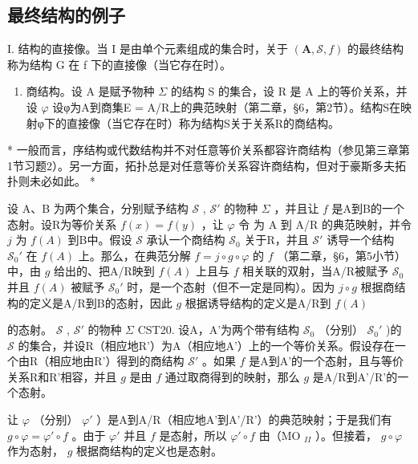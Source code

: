 \subsection{最终结构的例子}

I. 结构的直接像。当 I 是由单个元素组成的集合时，关于 \((\mathbf{A}, \mathcal{S}, f)\) 的最终结构称为结构 G 在 f 下的直接像（当它存在时）。

\begin{enumerate}
\def\labelenumi{\Roman{enumi}.}
\setcounter{enumi}{1}
\tightlist
\item
  商结构。设 A 是赋予物种 \(\Sigma\) 的结构 S 的集合，设 R 是 A 上的等价关系，并设 \(\varphi\) 设φ为A到商集E = A/R上的典范映射（第二章，§6，第2节）。结构S在映射φ下的直接像（当它存在时）称为结构S关于关系R的商结构。
\end{enumerate}

* 一般而言，序结构或代数结构并不对任意等价关系都容许商结构（参见第三章第1节习题2）。另一方面，拓扑总是对任意等价关系容许商结构，但对于豪斯多夫拓扑则未必如此。 *

设 A、B 为两个集合，分别赋予结构 \(\mathcal{S}\) , \(\mathcal{S}'\) 的物种 \(\Sigma\) ，并且让 \(f\) 是A到B的一个态射。设R为等价关系 \(f(x) = f(y)\) ，让 \(\varphi\) 令 为 A 到 A/R 的典范映射，并令 \(j\) 为 \(f(A)\) 到B中。假设 \(\mathcal{S}\) 承认一个商结构 \(\mathcal{S}_0\) 关于R，并且 \(\mathcal{S}'\) 诱导一个结构 \(\mathcal{S}_0'\) 在 \(f(A)\) 上。那么，在典范分解 \(f = j \circ g \circ \varphi\) 的 \(f\) （第二章，§6，第5小节）中，由 \(g\) 给出的、把A/R映到 \(f(A)\) 上且与 \(f\) 相关联的双射，当A/R被赋予 \(\mathcal{S}_0\) 并且 \(f(A)\) 被赋予 \(\mathcal{S}_0'\) 时，是一个态射（但不一定是同构）。因为 \(j \circ g\) 根据商结构的定义是A/R到B的态射，因此 \(g\) 根据诱导结构的定义是A/R到 \(f(A)\)

的态射。 \(\mathcal{S}\) , \(\mathcal{S}'\) 的物种 \(\Sigma\) CST20. 设A，A'为两个带有结构 \(\mathcal{S}_0\) （分别） \(\mathcal{S}_0'\) )的 \(\mathcal{S}\) 的集合，并设R（相应地R'）为A（相应地A'）上的一个等价关系。假设存在一个由R（相应地由R'）得到的商结构 \(\mathcal{S}'\) 。如果 \(f\) 是A到A'的一个态射，且与等价关系R和R'相容，并且 \(g\) 是由 \(f\) 通过取商得到的映射，那么 \(g\) 是A/R到A'/R'的一个态射。

让 \(\varphi\) （分别） \(\varphi'\) ）是A到A/R（相应地A'到A'/R'）的典范映射；于是我们有 \(g \circ \varphi = \varphi' \circ f\) 。由于 \(\varphi'\) 并且 \(f\) 是态射，所以 \(\varphi' \circ f\) 由（MO \(_{II}\) ）。但接着， \(g \circ \varphi\) 作为态射， \(g\) 根据商结构的定义也是态射。

